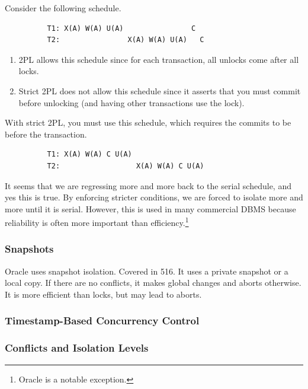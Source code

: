 \documentclass{article}
\begin{document}
      \begin{example}[2PL vs Strict 2PL]
        Consider the following schedule. 
        \begin{lstlisting}
          T1: X(A) W(A) U(A)                C
          T2:                X(A) W(A) U(A)   C
        \end{lstlisting}
        \begin{enumerate}
          \item 2PL allows this schedule since for each transaction, all unlocks come after all locks. 
          \item Strict 2PL does not allow this schedule since it asserts that you must commit before unlocking (and having other transactions use the lock). 
        \end{enumerate} 
        With strict 2PL, you must use this schedule, which requires the commits to be before the transaction. 
        \begin{lstlisting}
          T1: X(A) W(A) C U(A) 
          T2:                  X(A) W(A) C U(A)
        \end{lstlisting}
      \end{example}

      It seems that we are regressing more and more back to the serial schedule, and yes this is true. By enforcing stricter conditions, we are forced to isolate more and more until it is serial. However, this is used in many commercial DBMS because reliability is often more important than efficiency.\footnote{Oracle is a notable exception.} 

    \subsubsection{Snapshots} 
      
      Oracle uses snapshot isolation. Covered in 516. It uses a private snapshot or a local copy. If there are no conflicts, it makes global changes and aborts otherwise. It is more efficient than locks, but may lead to aborts.  

    \subsubsection{Timestamp-Based Concurrency Control} 
      
      

    \subsubsection{Conflicts and Isolation Levels}
\end{document}

